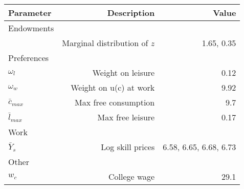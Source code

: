 \begin{tabular}{lrr}
\hline
Parameter & Description  & Value  \\ 
\hline
Endowments &   &   \\ 
 & Marginal distribution of $z$  & 1.65, 0.35  \\ 
Preferences &   &   \\ 
$\omega_{l}$ & Weight on leisure  & 0.12  \\ 
$\omega_{w}$ & Weight on u(c) at work  & 9.92  \\ 
$\bar{c}_{max}$ & Max free consumption  & 9.7  \\ 
$\bar{l}_{max}$ & Max free leisure  & 0.17  \\ 
Work &   &   \\ 
$\bar{Y}_{s}$ & Log skill prices  & 6.58, 6.65, 6.68, 6.73  \\ 
Other &   &   \\ 
$w_{c}$ & College wage  & 29.1  \\ 
\hline
\end{tabular}%
